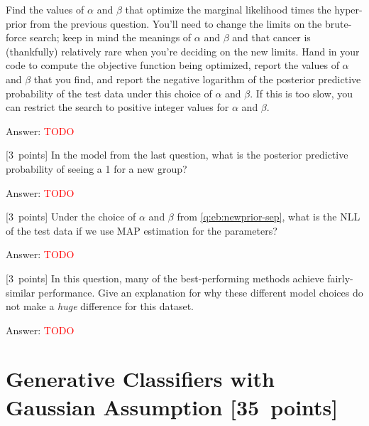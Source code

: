 \documentclass{article}
\newcommand{\ask}[1]{\textcolor{question}{#1}}
\newenvironment{answer}{\par\begingroup\color{answer}Answer: }{\endgroup}
\newcommand{\red}[1]{\textcolor{red}{#1}}
\newcommand{\pts}[1]{\textcolor{points}{[#1~points]}}
\newcommand{\TODO}{\red{TODO}}
\begin{document}
\begin{qlist}
    Find the values of $\alpha$ and $\beta$ that optimize the marginal likelihood times the hyper-prior from the previous question.
    You'll need to change the limits on the brute-force search;
    keep in mind the meanings of $\alpha$ and $\beta$ and that cancer is (thankfully) relatively rare when you're deciding on the new limits.
    \ask{Hand in your code to compute the objective function being optimized,
         report the values of $\alpha$ and $\beta$ that you find,
         and report the negative logarithm of the posterior predictive probability of the test data under this choice of $\alpha$ and $\beta$.}
    If this is too slow, you can restrict the search to positive integer values for $\alpha$ and $\beta$.

\begin{answer}\TODO\end{answer}

\item \pts{3}
    In the model from the last question,
    \ask{what is the posterior predictive probability of seeing a 1 for a new group?}

\begin{answer}\TODO\end{answer}

\item \pts{3}
    Under the choice of $\alpha$ and $\beta$ from \cref{q:eb:newprior-sep},
    \ask{what is the NLL of the test data if we use MAP estimation for the parameters?}

\begin{answer}\TODO\end{answer}

\item \pts{3}
    In this question, many of the best-performing methods achieve fairly-similar performance.
    \ask{Give an explanation for why these different model choices do not make a \emph{huge} difference for this dataset.}

\begin{answer}\TODO\end{answer}
\end{qlist}



\clearpage
\section{Generative Classifiers with Gaussian Assumption \pts{35}}
\end{document}
